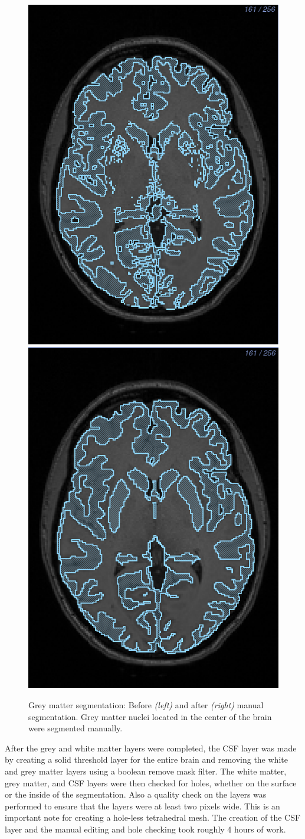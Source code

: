 \begin{figure}[H]
\begin{center}
\includegraphics[width=.49\textwidth]{Figures/greymatter_before_nuclei}
\includegraphics[width=.49\textwidth]{Figures/greymatter_added_nuclei}
\caption{Grey matter segmentation: Before \textit{(left)} and after \textit{(right)} manual segmentation. Grey matter nuclei located in the center of the brain were segmented manually.}
\label{fig:gm}
\end{center}
\end{figure}

After the grey and white matter layers were completed, the CSF layer was made by creating a solid threshold layer for the entire brain and removing the white and grey matter layers using a boolean remove mask filter. The white matter, grey matter, and CSF layers were then checked for holes, whether on the surface or the inside of the segmentation. Also a quality check on the layers was performed to ensure that the layers were at least two pixels wide. This is an important note for creating a hole-less tetrahedral mesh. The creation of the CSF layer and the manual editing and hole checking took roughly 4 hours of work.

